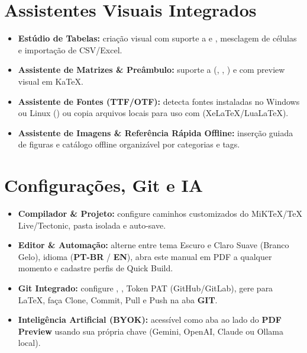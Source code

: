 \documentclass[11pt,a4paper]{article}
\begin{document}
\section{Assistentes Visuais Integrados}
\begin{itemize}
  \item \textbf{Estúdio de Tabelas:} criação visual com suporte a  e , mesclagem de células e importação de CSV/Excel.
  \item \textbf{Assistente de Matrizes \& Preâmbulo:} suporte a  (, , ) e  com preview visual em KaTeX.
  \item \textbf{Assistente de Fontes (TTF/OTF):} detecta fontes instaladas no Windows ou Linux () ou copia arquivos locais para uso com  (XeLaTeX/LuaLaTeX).
  \item \textbf{Assistente de Imagens \& Referência Rápida Offline:} inserção guiada de figuras e catálogo offline organizável por categorias e tags.
\end{itemize}

\section{Configurações, Git e IA}
\begin{itemize}
  \item \textbf{Compilador \& Projeto:} configure caminhos customizados do MiKTeX/TeX Live/Tectonic, pasta isolada  e auto-save.
  \item \textbf{Editor \& Automação:} alterne entre tema Escuro e Claro Suave (Branco Gelo), idioma (\textbf{PT-BR} / \textbf{EN}), abra este manual em PDF a qualquer momento e cadastre perfis de Quick Build.
  \item \textbf{Git Integrado:} configure , , Token PAT (GitHub/GitLab), gere  para \LaTeX{}, faça Clone, Commit, Pull e Push na aba \textbf{GIT}.
  \item \textbf{Inteligência Artificial (BYOK):} acessível como aba ao lado do \textbf{PDF Preview} usando sua própria chave (Gemini, OpenAI, Claude ou Ollama local).
\end{itemize}
\end{document}

